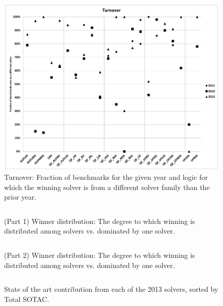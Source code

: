 \documentclass[smallcondensed]{svjour3}
\begin{document}
\begin{figure}
\centering
\includegraphics[width=\columnwidth]{turnover.pdf}
%
\caption{Turnover: Fraction of benchmarks for the given year and logic for which the winning solver is from a different solver family than the prior year.}
\label{Fig:turnover}
\end{figure}


\begin{figure}
\centering
\centering
\begin{tabular}{|ll|ccrrr|}
\hline

\end{tabular}
\caption{(Part 1) Winner distribution: The degree to which winning is distributed among solvers vs. dominated by one solver.}
\label{Fig:entropyA}
\end{figure}

\begin{figure}
\centering
\begin{tabular}{|ll|ccrrr|}
\hline

\end{tabular}
\caption{(Part 2) Winner distribution: The degree to which winning is distributed among solvers vs. dominated by one solver.}
\label{Fig:entropyB}
\end{figure}


\begin{figure}
\centering
\begin{tabular}{|l|rrr|}
\hline

\hline
\end{tabular}
\caption{State of the art contribution from each of the 2013 solvers, sorted by Total SOTAC.}
\label{Fig:sotac}
\end{figure}
\end{document}
